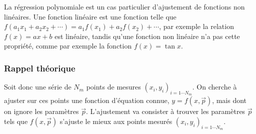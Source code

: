La régression polynomiale est un cas particulier d'ajustement de fonctions non linéaires. Une fonction linéaire est une fonction telle que $f(a_1x_1+a_2x_2+\cdots)=a_1f(x_1)+a_2f(x_2)+\cdots$, par exemple la relation $f(x)=ax+b$ est linéaire, tandis qu'une fonction non linéaire n'a pas cette propriété, comme par exemple la fonction $f(x)=\tan{x}$.

\subsubsection*{Rappel théorique}

Soit donc une série de $N_m$ points de mesures $(x_i,y_i)_{i=1\cdots N_m}$. On cherche à ajuster sur ces points une fonction d'équation connue, $y=f(x,\vec{p})$, mais dont on ignore les paramètres $\vec{p}$. L'ajustement va consister à trouver les paramètres $\vec{p}$ tels que $f(x,\vec{p})$ s'ajuste le mieux aux points mesurés $(x_i,y_i)_{i=1\cdots N_m}$.

